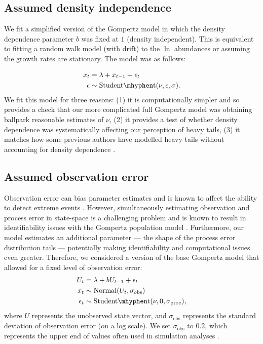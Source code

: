 \subsection{Assumed density independence}\label{assumed-density-independence}

We fit a simplified version of the Gompertz model in which the density dependence parameter $b$ was fixed at $1$ (density independent). This is equivalent to fitting a random walk model (with drift) to the $\ln$ abundances or assuming the growth rates are stationary. The model was as follows: 

\begin{align*}
x_t &= \lambda + x_{t-1} + \epsilon_t\\
\epsilon &\sim \mathrm{Student\mhyphen t}(\nu, \epsilon, \sigma).
\end{align*}
We fit this model for three reasons: (1) it is computationally simpler and so provides a check that our more complicated full Gompertz model was obtaining ballpark reasonable estimates of $\nu$, (2) it provides a test of whether density dependence was systematically affecting our perception of heavy tails, (3) it matches how some previous authors have modelled heavy tails without accounting for density dependence \citep{segura2013}.

\subsection{Assumed observation error}

Observation error can bias parameter estimates \citep[e.g.][]{knape2012} and is known to affect the ability to detect extreme events \citep{ward2007}. However, simultaneously estimating observation and process error in state-space is a challenging problem and is known to result in identifiability issues with the Gompertz population model \citep{knape2008}. Furthermore, our model estimates an additional parameter --- the shape of the process error distribution tails --- potentially making identifiability and computational issues even greater. Therefore, we considered a version of the base Gompertz model that allowed for a fixed level of observation error:
\begin{align*}
U_t &= \lambda + b U_{t-1} + \epsilon_t\\
x_t &\sim \mathrm{Normal}(U_t, \sigma_\mathrm{obs})\\
\epsilon_t &\sim \mathrm{Student\mhyphen t}(\nu, 0, \sigma_\mathrm{proc}),
\end{align*}
where $U$ represents the unobserved state vector, and $\sigma_\mathrm{obs}$ represents the standard deviation of observation error (on a log scale). We set $\sigma_\mathrm{obs}$ to $0.2$, which represents the upper end of values often used in simulation analyses \citep[e.g.][]{valpine2002, thorson2014b}.


